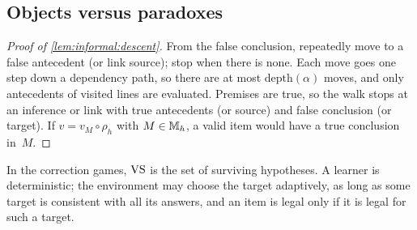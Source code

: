 \subsection{Objects versus paradoxes}\label{app:informal:objects}

\begin{proof}[Proof of \cref{lem:informal:descent}]
From the false conclusion, repeatedly move to a false antecedent (or link source); stop when there is none. Each move goes one step down a dependency path, so there are at most $\mathrm{depth}(\alpha)$ moves, and only antecedents of visited lines are evaluated. Premises are true, so the walk stops at an inference or link with true antecedents (or source) and false conclusion (or target). If $v=v_M\circ\rho_h$ with $M\in\mathbb M_h$, a valid item would have a true conclusion in~$M$.
\end{proof}

In the correction games, $\mathrm{VS}$ is the set of surviving hypotheses. A learner is deterministic; the environment may choose the target adaptively, as long as some target is consistent with all its answers, and an item is legal only if it is legal for such a target.


